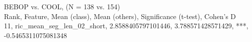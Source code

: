 BEBOP vs. COOL, (N = 138 vs. 154)\\
Rank, Feature, Mean (class), Mean (others), Significance (t-test), Cohen's D\\
11, ric_mean_seg_len_02_short, 2.8588405797101446, 3.788571428571429, ***, -0.5465311075081348\\
